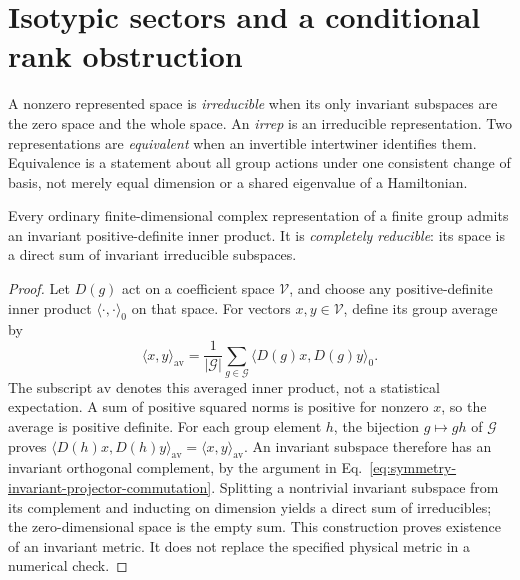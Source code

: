 \section{Isotypic sectors and a conditional rank obstruction}

\begin{definition}
\label{def:symmetry-irreducibility}
A nonzero represented space is \emph{irreducible} when its only invariant
subspaces are the zero space and the whole space. An \emph{irrep} is an
irreducible representation. Two representations are \emph{equivalent} when
an invertible intertwiner identifies them. Equivalence is a statement about
all group actions under one consistent change of basis, not merely equal
dimension or a shared eigenvalue of a Hamiltonian.
\end{definition}

\begin{lemma}
\label{lem:symmetry-complete-reducibility}
Every ordinary finite-dimensional complex representation of a finite group
admits an invariant positive-definite inner product. It is \emph{completely
reducible}: its space is a direct sum of invariant irreducible subspaces.
\end{lemma}
\begin{proof}
Let $D(g)$ act on a coefficient space $\mathcal V$, and choose any
positive-definite inner product $\langle\cdot,\cdot\rangle_0$ on that space.
For vectors $x,y\in\mathcal V$, define its group average by
\begin{equation}
  \langle x,y\rangle_{\mathrm{av}}
    =\frac{1}{|\mathcal G|}\sum_{g\in\mathcal G}
         \langle D(g)x,D(g)y\rangle_0.
  \label{eq:symmetry-averaged-inner-product}
\end{equation}
The subscript $\mathrm{av}$ denotes this averaged inner product, not a
statistical expectation. A sum of positive squared norms is positive for
nonzero $x$, so the average is positive definite. For each group element
$h$, the bijection $g\mapsto gh$ of $\mathcal G$ proves
$\langle D(h)x,D(h)y\rangle_{\mathrm{av}}
=\langle x,y\rangle_{\mathrm{av}}$.
An invariant subspace therefore has an invariant orthogonal complement, by
the argument in Eq.~\eqref{eq:symmetry-invariant-projector-commutation}.
Splitting a nontrivial invariant subspace from its complement and inducting
on dimension yields a direct sum of irreducibles; the zero-dimensional space
is the empty sum. This construction proves existence of an invariant metric.
It does not replace the specified physical metric in a numerical check.
\end{proof}

